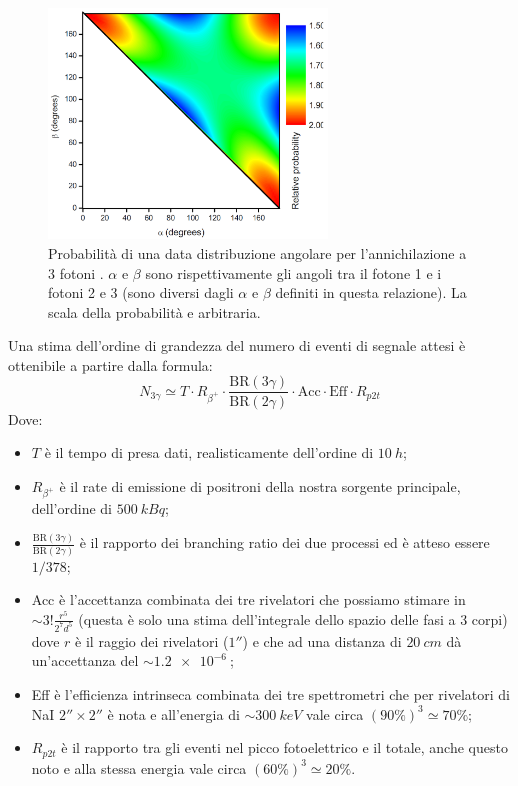 \begin{figure}[h]
	\centering
	\includegraphics[width=20em]{immagini/3gamma_distribution}
	\caption{\label{fig:3gamma_angular_distr}Probabilità di una data distribuzione angolare per l'annichilazione a 3 fotoni \cite{4}. $\alpha$ e $\beta$ sono rispettivamente gli angoli tra il fotone 1 e i fotoni 2 e 3
	(sono diversi dagli $\alpha$ e $\beta$ definiti in questa relazione).
	La scala della probabilità e arbitraria.}
\end{figure}


Una stima dell'ordine di grandezza del numero di eventi di segnale attesi è ottenibile a partire dalla formula:
\begin{equation}
\label{eq:stima_3gamma}
N_{3\gamma} \simeq T \cdot R_{\beta^+} \cdot \frac{\text{BR}(3\gamma)}{\text{BR}(2\gamma)} \cdot \text{Acc} \cdot \text{Eff} \cdot R_{p2t}
\end{equation}
Dove:
\begin{itemize}
	\item $T$ è il tempo di presa dati, realisticamente dell'ordine di $\SI{10}{h}$;
	\item $R_{\beta^+}$ è il rate di emissione di positroni della nostra sorgente principale, dell'ordine di $\SI{500}{kBq}$;
	\item $\frac{\text{BR}(3\gamma)}{\text{BR}(2\gamma)}$ è il rapporto dei branching ratio dei due processi ed è atteso essere $1/378$;
	\item Acc è l'accettanza combinata dei tre rivelatori che possiamo stimare in $\sim 3!\frac{r^5}{2^7 d^5}$ (questa è solo una stima dell'integrale dello spazio delle fasi a 3 corpi) dove $r$ è il raggio dei rivelatori ($1''$) e che ad una distanza di $\SI{20}{cm}$ dà un'accettanza del $\sim\SI{1.2e-6}{}$;
	\item Eff è l'efficienza intrinseca combinata dei tre spettrometri che per rivelatori di NaI $2''\times2''$ è nota \cite{3} e all'energia di $\sim \SI{300}{keV}$ vale circa $(90\%)^3 \simeq  70\%$;
	\item $R_{p2t}$ è il rapporto tra gli eventi nel picco fotoelettrico e il totale, anche questo noto \cite{3} e alla stessa energia vale circa $(60\%)^3 \simeq 20\%$.
\end{itemize}
